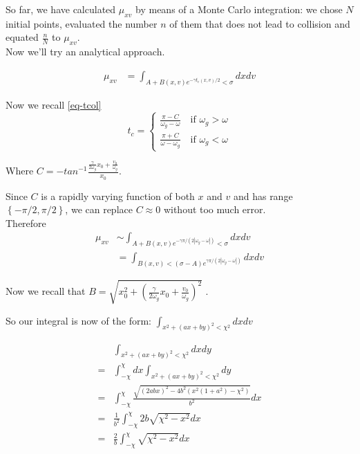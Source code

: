 \documentclass{book}
\renewcommand{\(}{\begin{columns}}
\renewcommand{\)}{\end{columns}}
\newcommand{\<}[1]{\begin{column}{#1}}
\renewcommand{\>}{\end{column}}
\begin{document}
So far, we have calculated $\mu_{xv}$ by means of a Monte Carlo integration: 
we chose $N$ initial points, evaluated the number $n$ of them that does 
not lead to collision and equated $\frac{n}{N}$ to $\mu_{xv}$.  \\

Now we'll try an analytical approach.  

\begin{align*}
\mu_{xv}&=\int_{A+B(x,v)e^{-\gamma t_c(x,v)/2}<\sigma}dxdv
\end{align*}


Now we recall \eqref{eq-tcol}
\begin{equation}
t_c= \left\{
\begin{matrix}
\frac{\pi-C}{\omega_g-\omega}\hspace{1em} \text{if }\omega_g>\omega\\
\frac{\pi+C}{\omega-\omega_g}\hspace{1em} \text{if }\omega_g<\omega
\end{matrix}
\right.  
\end{equation}


Where $C=-tan^{-1}\frac{\frac{\gamma}{2\omega_g}x_0+\frac{v_0}{\omega_g}}{x_0}$.  

Since $C$ is a rapidly varying function of both $x$ and $v$ and has range 
$\left\{-\pi/2,\pi/2\right\}$, we can replace $C\approx 0$ without too much error.  \\

Therefore 
\begin{align*}
\mu_{xv}&\sim\int_{A+B(x,v)e^{-\gamma \pi/(2|\omega_g-\omega|)}<\sigma}dxdv\\
&=\int_{B(x,v)<(\sigma-A)e^{\gamma \pi/(2|\omega_g-\omega|)}}dxdv
\end{align*}

Now we recall that 
$B=\sqrt{x_0^2+\left(\frac{\gamma}{2\omega_g}x_0+\frac{v_0}{\omega_g}\right)^2}$
.  

So our integral is now of the form:
$\int_{x^2+(ax+by)^2<\chi^2}dxdv$


\begin{align*}
&\int_{x^2+(ax+by)^2<\chi^2}dxdy\\
=&\int_{-\chi}^{\chi}dx\int_{x^2+(ax+by)^2<\chi^2} dy\\
=&\int_{-\chi}^{\chi} \frac{\sqrt{(2abx)^2-4b^2(x^2(1+a^2)-\chi^2)}}{b^2}   dx\\
=&\frac{1}{b^2}\int_{-\chi}^{\chi}2b\sqrt{\chi^2-x^2} dx\\
=&\frac{2}{b}\int_{-\chi}^{\chi}\sqrt{\chi^2-x^2} dx
\end{align*}
\end{document}
